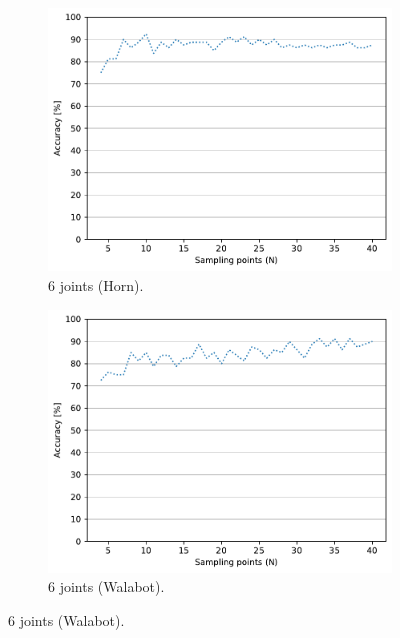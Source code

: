 \begin{figure}[htbp]
    \begin{subfigure}{.49\textwidth}
        \centering
        \includegraphics[width=.99\linewidth]{Figures/RadarExperiments/Datasets/SensorsComparison/LMC/LMC+Horn-samples-6.pdf}
        \vspace{-15pt}
        \captionsetup{width=.99\linewidth}
        \caption{6 joints (Horn).}
        \label{fig:radar-experiments:sensors:lmc-samples:horn-6}
    \end{subfigure}
    \begin{subfigure}{.49\textwidth}
        \centering
        \includegraphics[width=.99\linewidth]{Figures/RadarExperiments/Datasets/SensorsComparison/LMC/LMC+Walabot-samples-6.pdf}
        \vspace{-15pt}
        \captionsetup{width=.99\linewidth}
        \caption{6 joints (Walabot).}
        \label{fig:radar-experiments:sensors:lmc-samples:walabot-6}
    \end{subfigure}


\end{figure}

